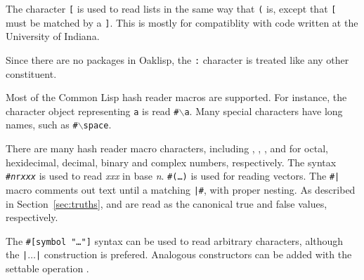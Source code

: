
The character \texttt{[} is used to read lists in the same way that
\texttt{(} is, except that \texttt{[} must be matched by a \texttt{]}.
This is mostly for compatiblity with code written at the University of
Indiana.

Since there are no packages in Oaklisp, the \texttt{:} character is
treated like any other constituent.

Most of the Common Lisp hash reader macros are supported.  For
instance, the character object representing \texttt{a} is read
\texttt{\#$\backslash$a}.  Many special characters have long names, such as
\texttt{\#$\backslash$space}.


There are many hash reader macro characters, including ,
, ,  and  for octal, hexidecimal,
decimal, binary and complex numbers, respectively.  The syntax
\texttt{\#\emph{n}r\emph{xxx}} is used to read \emph{xxx} in base \emph{n}.
\texttt{\#(\ldots)} is used for reading vectors.  The \texttt{\#|} macro
comments out text until a matching \texttt{|\#}, with proper nesting.  As
described in Section~\ref{sec:truths},  and  are read
as the canonical true and false values, respectively.

The \texttt{\#[symbol "\ldots"]} syntax can be used to read arbitrary
characters, although the \texttt{|$\ldots$|} construction is prefered.
Analogous constructors can be added with the settable operation
.




